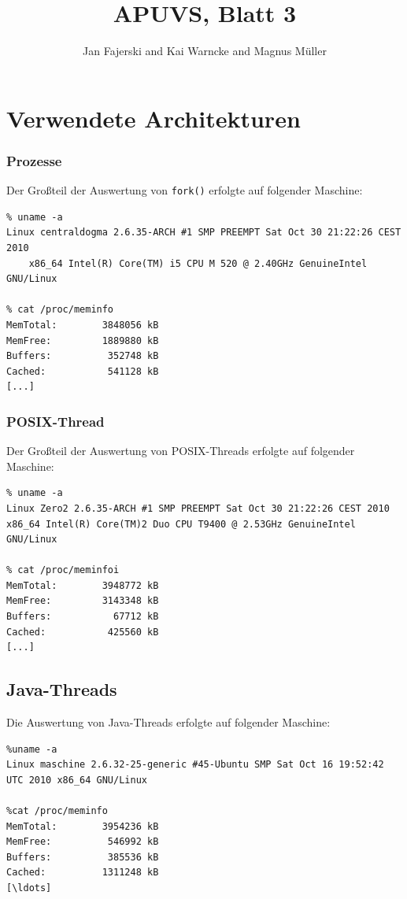 \documentclass[a4paper,
12pt,
BCOR12mm,
]{scrartcl}
\title{APUVS, Blatt 3}
\author{Jan Fajerski and Kai Warncke and Magnus Müller}
\begin{document}

\maketitle  

\section{Verwendete Architekturen}
\subsubsection{Prozesse}
Der Großteil der Auswertung von \verb|fork()| erfolgte auf folgender Maschine:
\begin{verbatim}
% uname -a
Linux centraldogma 2.6.35-ARCH #1 SMP PREEMPT Sat Oct 30 21:22:26 CEST 2010
	x86_64 Intel(R) Core(TM) i5 CPU M 520 @ 2.40GHz GenuineIntel GNU/Linux

% cat /proc/meminfo
MemTotal:        3848056 kB
MemFree:         1889880 kB
Buffers:          352748 kB
Cached:           541128 kB
[...]
\end{verbatim}

\subsubsection{POSIX-Thread}
Der Großteil der Auswertung von POSIX-Threads erfolgte auf folgender Maschine:
\begin{verbatim}
% uname -a
Linux Zero2 2.6.35-ARCH #1 SMP PREEMPT Sat Oct 30 21:22:26 CEST 2010 
x86_64 Intel(R) Core(TM)2 Duo CPU T9400 @ 2.53GHz GenuineIntel GNU/Linux

% cat /proc/meminfoi
MemTotal:        3948772 kB
MemFree:         3143348 kB
Buffers:           67712 kB
Cached:           425560 kB
[...]
\end{verbatim}

\subsection{Java-Threads}
Die Auswertung von Java-Threads erfolgte auf folgender Maschine:
\begin{verbatim}
%uname -a
Linux maschine 2.6.32-25-generic #45-Ubuntu SMP Sat Oct 16 19:52:42 UTC 2010 x86_64 GNU/Linux

%cat /proc/meminfo
MemTotal:        3954236 kB
MemFree:          546992 kB
Buffers:          385536 kB
Cached:          1311248 kB
[\ldots]
\end{verbatim}
\end{document}
